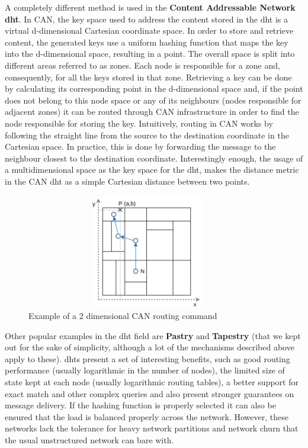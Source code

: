 A completely different method is used in the \textbf{Content Addressable
Network \acrshort{dht}}\cite{Ratnasamy2001a}. In CAN, the key space used to
address the content stored in the \acrshort{dht} is a virtual d-dimensional
Cartesian coordinate space. In order to store and retrieve content, the
generated keys use a uniform hashing function that maps the key into the
d-dimensional space, resulting in a point. The overall space is split
into different areas referred to as zones. Each node is responsible for
a zone and, consequently, for all the keys stored in that zone.
Retrieving a key can be done by calculating its corresponding point in
the d-dimensional space and, if the point does not belong to this node
space or any of its neighbours (nodes responsible for adjacent zones) it
can be routed through CAN infrastructure in order to find the node
responsible for storing the key. Intuitively, routing in CAN works by
following the straight line from the source to the destination
coordinate in the Cartesian space. In practice, this is done by
forwarding the message to the neighbour closest to the destination
coordinate. Interestingly enough, the usage of a multidimensional space
as the key space for the \acrshort{dht}, makes the distance metric in the CAN \acrshort{dht}
as a simple Cartesian distance between two points.

\begin{figure}[hb!]
  \centering
  \includegraphics[max height=5cm,max width=0.95\textwidth]{img/can.png}
  \caption{Example of a 2 dimensional CAN routing command}
  \label{fig:can}
\end{figure}

Other popular examples in the \acrshort{dht} field are \textbf{Pastry} \cite{Rowstron2001} and
\textbf{Tapestry} \cite{Zhao2006} (that we kept out for the sake of simplicity, although
a lot of the mechanisms described above apply to these). \acrshort{dht}s present a
set of interesting benefits, such as good routing performance (usually
logarithmic in the number of nodes), the limited size of state kept at
each node (usually logarithmic routing tables), a better support for
exact match and other complex queries and also present stronger
guarantees on message delivery. If the hashing function is properly
selected it can also be ensured that the load is balanced properly
across the network. However, these networks lack the tolerance for heavy
network partitions and network churn that the usual unstructured network
can bare with.
\bigskip

